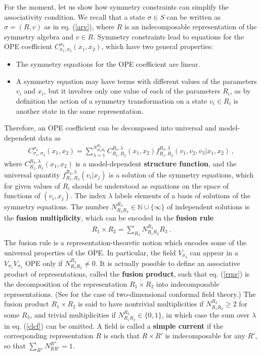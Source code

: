 \documentclass[12pt,a4paper,notitlepage]{report}
\newcommand \N {\mathbb{N}}
\numberwithin{equation}{section}
\theoremstyle{break}
\begin{document}
For the moment, let us show how symmetry constraints can simplify the associativity condition. We recall that a state $\sigma\in S$ can be written as $\sigma=(R,v)$ as in eq. (\ref{arv}), where $R$ is an indecomposable representation of the symmetry algebra and $v\in R$. Symmetry constraints lead to equations for the OPE coefficient 
$C_{\sigma_1,\sigma_2}^{\sigma_3}(x_1,x_2)$, which have two general properties:
\begin{itemize}
 \item The symmetry equations for the OPE coefficient are linear.
\item A symmetry equation may have terms with different values of the parameters $v_i$ and $x_i$, but it involves only one value of each of the parameters $R_i$, as by definition the action of a symmetry transformation on a state $v_i\in R_i$ is another state in the same representation. 
\end{itemize}
Therefore, an OPE coefficient can be decomposed into universal and model-dependent data as
\begin{align}
 C_{\sigma_1,\sigma_2}^{\sigma_3}(x_1,x_2) = \sum_{\lambda=1}^{N_{R_1R_2}^{R_3}} C_{R_1,R_2}^{R_3,\lambda}(x_1,x_2) f_{R_1,R_2}^{R_3,\lambda}(v_1,v_2,v_3|x_1,x_2)\ ,
\label{clcf}
\end{align}
where $C_{R_1,R_2}^{R_3,\lambda}(x_1,x_2)$ is a model-dependent \textbf{\boldmath structure function}, and 
the universal quantity $f_{R_1,R_2}^{R_3,\lambda}(v_i|x_j)$ is a solution of the symmetry equations, which for given values of $R_i$ should be understood as equations on the space of functions of $(v_i,x_j)$. The index $\lambda$ labels elements of a basis of solutions of the symmetry equations. The number $N_{R_1R_2}^{R_3}\in \N \cup \{\infty\}$ of independent solutions is the \textbf{\boldmath fusion multiplicity}, which can be encoded in the \textbf{\boldmath fusion rule}
\begin{align}
 R_1 \times R_2  = \sum_{R_3} N_{R_1R_2}^{R_3} R_3 \ . 
\label{rrnr}
\end{align}
The fusion rule is a representation-theoretic notion which encodes some of the universal properties of the OPE. In particular, the field $V_{\sigma_3}$ can appear in a $V_{\sigma_1}V_{\sigma_2}$ OPE only if $N_{R_1R_2}^{R_3}\neq 0$. It is actually possible to define an associative product of representations, called the \textbf{\boldmath fusion product}, such that eq. (\ref{rrnr}) is the decomposition of the representation $R_1\times R_2$ into indecomposable representations. (See \cite{gab99} for the case of two-dimensional conformal field theory.) 
The fusion product $R_1\times R_2$ is said to have nontrivial multiplicities if $N_{R_1R_2}^{R_3}\geq 2$ for some $R_3$, and trivial multiplicities if $N_{R_1R_2}^{R_3}\in \{0,1\}$, in which case the sum over $\lambda$ in eq. (\ref{clcf}) can be omitted. A field is called a \textbf{\boldmath simple current} if the corresponding representation $R$ is such that $R\times R'$ is indecomposable for any $R'$, so that $\sum_{R''} N_{RR'}^{R''} =1$. 
\end{document}
